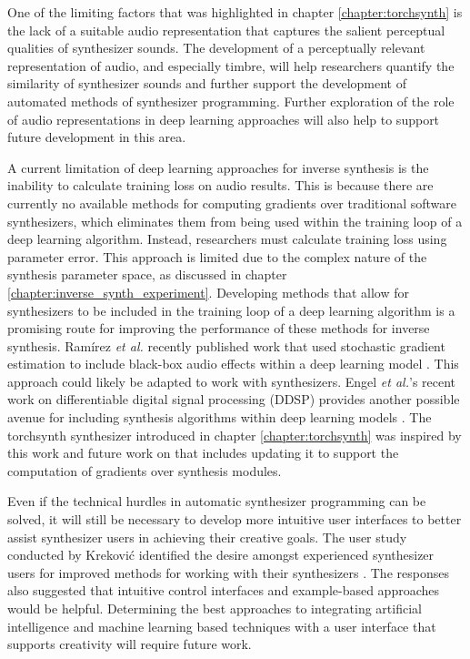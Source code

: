 One of the limiting factors that was highlighted in chapter \ref{chapter:torchsynth} is the lack of a suitable audio representation that captures the salient perceptual qualities of synthesizer sounds. The development of a perceptually relevant representation of audio, and especially timbre, will help researchers quantify the similarity of synthesizer sounds and further support the development of automated methods of synthesizer programming. Further exploration of the role of audio representations in deep learning approaches will also help to support future development in this area. 

A current limitation of deep learning approaches for inverse synthesis is the inability to calculate training loss on audio results. This is because there are currently no available methods for computing gradients over traditional software synthesizers, which eliminates them from being used within the training loop of a deep learning algorithm. Instead, researchers must calculate training loss using parameter error. This approach is limited due to the complex nature of the synthesis parameter space, as discussed in chapter \ref{chapter:inverse_synth_experiment}. Developing methods that allow for synthesizers to be included in the training loop of a deep learning algorithm is a promising route for improving the performance of these methods for inverse synthesis. Ramírez \textit{et al.} recently published work that used stochastic gradient estimation to include black-box audio effects within a deep learning model \cite{ramirez2021differentiable}. This approach could likely be adapted to work with synthesizers. Engel \textit{et al.}'s recent work on differentiable digital signal processing (DDSP) provides another possible avenue for including synthesis algorithms within deep learning models \cite{engel2020ddsp}. The torchsynth synthesizer introduced in chapter \ref{chapter:torchsynth} was inspired by this work and future work on that includes updating it to support the computation of gradients over synthesis modules.

Even if the technical hurdles in automatic synthesizer programming can be solved, it will still be necessary to develop more intuitive user interfaces to better assist synthesizer users in achieving their creative goals. The user study conducted by Krekovi\'{c} identified the desire amongst experienced synthesizer users for improved methods for working with their synthesizers \cite{krekovic2019insights}. The responses also suggested that intuitive control interfaces and example-based approaches would be helpful. Determining the best approaches to integrating artificial intelligence and machine learning based techniques with a user interface that supports creativity will require future work.

